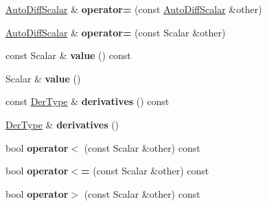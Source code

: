 \begin{DoxyCompactItemize}
\item 
\mbox{\label{class_eigen_1_1_auto_diff_scalar_a4cec60f865a47b617b304656113e7e86}} 
\hyperlink{class_eigen_1_1_auto_diff_scalar}{Auto\+Diff\+Scalar} \& {\bfseries operator=} (const \hyperlink{class_eigen_1_1_auto_diff_scalar}{Auto\+Diff\+Scalar} \&other)
\item 
\mbox{\label{class_eigen_1_1_auto_diff_scalar_a6486270a88aa96b2e01bd2b3382f2f8b}} 
\hyperlink{class_eigen_1_1_auto_diff_scalar}{Auto\+Diff\+Scalar} \& {\bfseries operator=} (const Scalar \&other)
\item 
\mbox{\label{class_eigen_1_1_auto_diff_scalar_a3fb25233941b46affc60c9569829656b}} 
const Scalar \& {\bfseries value} () const
\item 
\mbox{\label{class_eigen_1_1_auto_diff_scalar_ac74045cd21468b08404b476f40d91433}} 
Scalar \& {\bfseries value} ()
\item 
\mbox{\label{class_eigen_1_1_auto_diff_scalar_a751db20e34259b41b88a6358ef20e857}} 
const \hyperlink{group___sparse_core___module}{Der\+Type} \& {\bfseries derivatives} () const
\item 
\mbox{\label{class_eigen_1_1_auto_diff_scalar_acaa6af130147e21082998a9b111cb51c}} 
\hyperlink{group___sparse_core___module}{Der\+Type} \& {\bfseries derivatives} ()
\item 
\mbox{\label{class_eigen_1_1_auto_diff_scalar_ad63290a36c032f2e8c6a0b0f2133a717}} 
bool {\bfseries operator$<$} (const Scalar \&other) const
\item 
\mbox{\label{class_eigen_1_1_auto_diff_scalar_af5971721bfb9a5130f229a1eeadc835d}} 
bool {\bfseries operator$<$=} (const Scalar \&other) const
\item 
\mbox{\label{class_eigen_1_1_auto_diff_scalar_a744744758d7f84a6c5025eef26acfbb4}} 
bool {\bfseries operator$>$} (const Scalar \&other) const
\item 

\end{DoxyCompactItemize}
